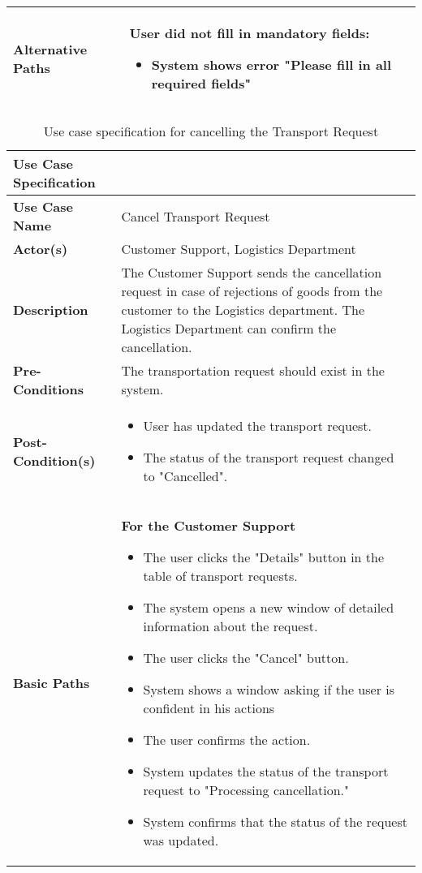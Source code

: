 \documentclass[a4paper]{article}
\begin{document}
\begin{longtable}{|p{}|p{}|}
      \hline
    \textbf{Alternative Paths} & User did not fill in mandatory fields: 
        \begin{itemize}
            \item System shows error "Please fill in all required fields"
        \end{itemize} \\
        \hline
    \end{longtable}
    
    
      \begin{longtable}{|p{}|p{}|}
        \caption{Use case specification for cancelling the Transport Request}
        \label{transport requestCancellationUseCase} \\
        \hline
        Use Case Specification  &  \\
         \hline
         \endhead
         \textbf{Use Case Name} & Cancel Transport Request \\
         \hline
         \textbf{Actor(s)} & Customer Support, Logistics Department \\
         \hline
         \textbf{Description} & The Customer Support sends the cancellation request in case of rejections of goods from the customer to the Logistics department. The Logistics Department can confirm the cancellation. \\
         \hline
         \textbf{Pre-Conditions} & The transportation request should exist in the system. \\
         \hline
        \textbf{Post-Condition(s)} & 
        \begin{itemize}
            \item User has updated the transport request.
            \item The status of the transport request changed to "Cancelled".
        \end{itemize} \\
         \hline
         \textbf{Basic Paths} & \textbf{For the Customer Support}
         \begin{itemize}
             \item The user clicks the "Details" button in the table of transport requests.
             \item The system opens a new window of detailed information about the request.
             \item The user clicks the "Cancel" button.
             \item System shows a window asking if the user is confident in his actions
             \item The user confirms the action.
             \item System updates the status of the transport request to "Processing cancellation."
             \item System confirms that the status of the request was updated.


\end{itemize}
\end{longtable}
\end{document}
